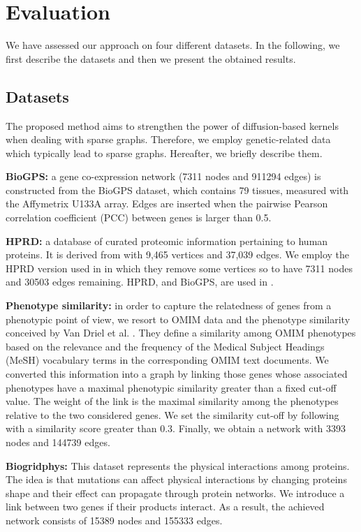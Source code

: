 \section{Evaluation}
\label{evaluation}
We have assessed our approach on four different datasets. In the following, we first describe the datasets and then we present the obtained results.
\subsection{Datasets}
The proposed method aims to strengthen the power of diffusion-based kernels when dealing with sparse graphs. Therefore, we employ  genetic-related data which typically lead to sparse graphs. Hereafter, we briefly describe them.

\textbf{BioGPS:} a gene co-expression network (7311 nodes and 911294 edges) is constructed from the BioGPS dataset, which contains 79 tissues, measured with the Affymetrix U133A array. Edges are inserted when the pairwise Pearson correlation coefficient (PCC) between genes is larger than 0.5.

\textbf{HPRD:} a database of curated proteomic information pertaining to human proteins. It is derived from \cite{jour5} with 9,465 vertices and 37,039 edges. We employ the HPRD version used in \cite{jour6} in which they remove some vertices so to have 7311 nodes and 30503 edges remaining. HPRD, and  BioGPS, are used in \cite{proceeding3}.

\textbf{Phenotype similarity:} in order to capture the relatedness of genes from a phenotypic point of view, we resort to OMIM \cite{jour4} data and the phenotype similarity conceived by Van Driel et al. \cite{jour5}. They define a similarity among OMIM phenotypes based on the relevance and the frequency of the Medical Subject Headings (MeSH) vocabulary terms in the corresponding OMIM text documents. We converted this information into a graph by linking those genes whose associated phenotypes have a maximal phenotypic similarity greater than a fixed cut-off value. The weight of the link is the maximal similarity among the phenotypes relative to the two considered genes. We set the similarity cut-off by following \cite{jour5} with a similarity score greater than $0.3$. Finally, we obtain a network with 3393 nodes and 144739 edges.

\textbf{Biogridphys:} This dataset represents the physical interactions among proteins. The idea is that mutations can affect physical interactions by changing proteins shape and their effect can propagate through protein networks. We introduce a link between two genes if their products interact. As a result, the achieved network consists of 15389 nodes and 155333 edges.

